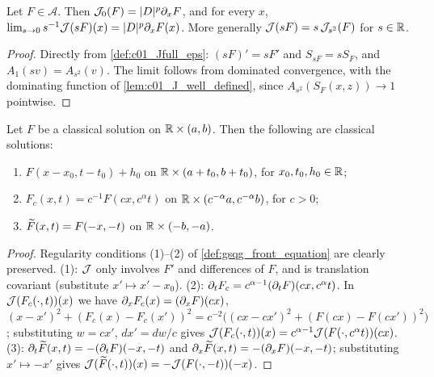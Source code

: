 \begin{lemma}
  \label{lem:c01_linearization}
  Let $F\in\mathcal A$.  Then $\mathcal{J}_0(F)=|D|^{p}\partial_xF$, and for every $x$,
  $\lim_{s\to0}s^{-1}\mathcal{J}(sF)(x)=|D|^p\partial_xF(x)$.  More generally
  $\mathcal{J}(sF)=s\,\mathcal{J}_{s^2}(F)$ for $s\in\mathbb{R}$.
\end{lemma}
\begin{proof}
  Directly from \cref{def:c01_Jfull_eps}: $(sF)'=sF'$ and $S_{sF}=sS_F$, and
  $A_1(sv)=A_{s^2}(v)$.  The limit follows from dominated convergence, with the dominating
  function of \cref{lem:c01_J_well_defined}, since $A_{s^2}(S_F(x,z))\to1$ pointwise.
\end{proof}

\begin{lemma}
  \label{lem:c01_front_symmetries}
  Let $F$ be a classical solution on $\mathbb{R}\times(a,b)$.  Then the following are classical solutions:
  \begin{enumerate}
    \item $F(x-x_0,t-t_0)+h_0$ on $\mathbb{R}\times(a+t_0,b+t_0)$, for $x_0,t_0,h_0\in\mathbb{R}$;
    \item $F_c(x,t)=c^{-1}F(cx,c^\alpha t)$ on $\mathbb{R}\times(c^{-\alpha}a,c^{-\alpha}b)$, for $c>0$;
    \item $\widetilde{F}(x,t)=F(-x,-t)$ on $\mathbb{R}\times(-b,-a)$.
  \end{enumerate}
\end{lemma}
\begin{proof}
  Regularity conditions (1)--(2) of \cref{def:gsqg_front_equation} are clearly preserved.
  (1): $\mathcal{J}$ only involves $F'$ and differences of $F$, and is translation covariant
  (substitute $x'\mapsto x'-x_0$).
  (2): $\partial_tF_c=c^{\alpha-1}(\partial_tF)(cx,c^\alpha t)$.  In $\mathcal{J}(F_c(\cdot,t))(x)$ we have
  $\partial_xF_c(x)=(\partial_xF)(cx)$, $(x-x')^2+(F_c(x)-F_c(x'))^2=c^{-2}\bigl((cx-cx')^2+(F(cx)-F(cx'))^2\bigr)$;
  substituting $w=cx'$, $dx'=dw/c$ gives $\mathcal{J}(F_c(\cdot,t))(x)=c^{\alpha-1}\mathcal{J}(F(\cdot,c^\alpha t))(cx)$.
  (3): $\partial_t\widetilde{F}(x,t)=-(\partial_tF)(-x,-t)$ and $\partial_x\widetilde{F}(x,t)=-(\partial_xF)(-x,-t)$; substituting
  $x'\mapsto -x'$ gives $\mathcal{J}(\widetilde{F}(\cdot,t))(x)=-\mathcal{J}(F(\cdot,-t))(-x)$.
\end{proof}

